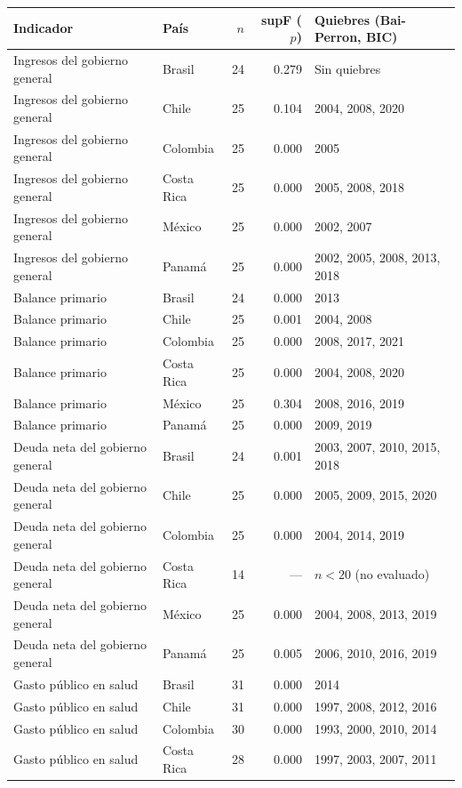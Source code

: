 \begin{tabular}{llrrl}
\toprule
Indicador & País & $n$ & supF ($p$) & Quiebres (Bai-Perron, BIC) \\
\midrule
Ingresos del gobierno general & Brasil & 24 & 0.279 & Sin quiebres \\
Ingresos del gobierno general & Chile & 25 & 0.104 & 2004, 2008, 2020 \\
Ingresos del gobierno general & Colombia & 25 & 0.000 & 2005 \\
Ingresos del gobierno general & Costa Rica & 25 & 0.000 & 2005, 2008, 2018 \\
Ingresos del gobierno general & México & 25 & 0.000 & 2002, 2007 \\
Ingresos del gobierno general & Panamá & 25 & 0.000 & 2002, 2005, 2008, 2013, 2018 \\
Balance primario & Brasil & 24 & 0.000 & 2013 \\
Balance primario & Chile & 25 & 0.001 & 2004, 2008 \\
Balance primario & Colombia & 25 & 0.000 & 2008, 2017, 2021 \\
Balance primario & Costa Rica & 25 & 0.000 & 2004, 2008, 2020 \\
Balance primario & México & 25 & 0.304 & 2008, 2016, 2019 \\
Balance primario & Panamá & 25 & 0.000 & 2009, 2019 \\
Deuda neta del gobierno general & Brasil & 24 & 0.001 & 2003, 2007, 2010, 2015, 2018 \\
Deuda neta del gobierno general & Chile & 25 & 0.000 & 2005, 2009, 2015, 2020 \\
Deuda neta del gobierno general & Colombia & 25 & 0.000 & 2004, 2014, 2019 \\
Deuda neta del gobierno general & Costa Rica & 14 & --- & $n<20$ (no evaluado) \\
Deuda neta del gobierno general & México & 25 & 0.000 & 2004, 2008, 2013, 2019 \\
Deuda neta del gobierno general & Panamá & 25 & 0.005 & 2006, 2010, 2016, 2019 \\
Gasto público en salud & Brasil & 31 & 0.000 & 2014 \\
Gasto público en salud & Chile & 31 & 0.000 & 1997, 2008, 2012, 2016 \\
Gasto público en salud & Colombia & 30 & 0.000 & 1993, 2000, 2010, 2014 \\
Gasto público en salud & Costa Rica & 28 & 0.000 & 1997, 2003, 2007, 2011 \\

\end{tabular}
